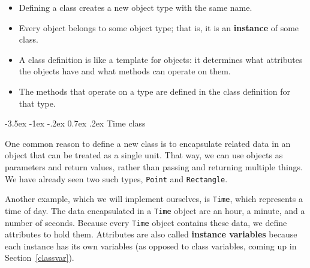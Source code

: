 \documentclass[12pt]{book}
\makeatletter
\theoremstyle{exercise}
\newcommand{\java}[1]{\verb"#1"}
\renewcommand{\section}{\@startsection{section}{1}{\z@}%
    {-3.5ex \@plus -1ex \@minus -.2ex}%
    {0.7ex \@plus.2ex}%
    {\normalfont\Large\bfseries}}
\newcommand{\java}[1]{\lstinline{#1}} %
\makeatother
\begin{document}
\begin{itemize}

\item Defining a class creates a new object type with the same name.


\item Every object belongs to some object type; that is, it is an {\bf instance} of some class.

\item A class definition is like a template for objects: it determines what attributes the objects have and what methods can operate on them.

\item The methods that operate on a type are defined in the class definition for that type.



\end{itemize}


\section{Time class}


One common reason to define a new class is to encapsulate related data in an object that can be treated as a single unit.
That way, we can use objects as parameters and return values, rather than passing and returning multiple things.
We have already seen two such types, \java{Point} and \java{Rectangle}.


Another example, which we will implement ourselves, is \java{Time}, which represents a time of day.
The data encapsulated in a \java{Time} object are an hour, a minute, and a number of seconds.
Because every \java{Time} object contains these data, we define attributes to hold them.
Attributes are also called {\bf instance variables} because each instance has its own variables (as opposed to class variables, coming up in Section~\ref{classvar}).
\end{document}
